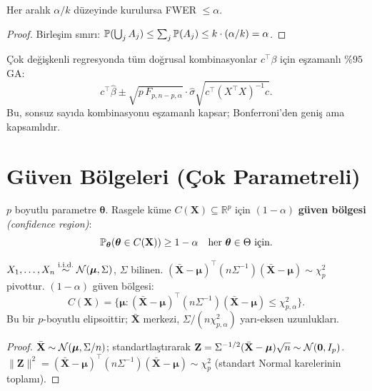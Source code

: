 \begin{teorem}\label{thm:bonferroni_ga}
Her aralık $\alpha/k$ düzeyinde kurulursa FWER $\leq\alpha$.
\end{teorem}

\begin{proof}
Birleşim sınırı: $\mathbb{P}(\bigcup_j A_j)\leq\sum_j\mathbb{P}(A_j)\leq k\cdot(\alpha/k)=\alpha$.
\end{proof}

\begin{teorem}\label{thm:scheffe_ga}
Çok değişkenli regresyonda tüm doğrusal kombinasyonlar $c^\top\beta$ için eşzamanlı \%$95$ GA:
\[
  c^\top\hat\beta \pm \sqrt{p\,F_{p,n-p,\alpha}}\cdot\hat\sigma\sqrt{c^\top(X^\top X)^{-1}c}.
\]
Bu, sonsuz sayıda kombinasyonu eşzamanlı kapsar; Bonferroni'den geniş ama kapsamlıdır.
\end{teorem}

\section{Güven Bölgeleri (Çok Parametreli)}
\label{sec:guven_bolgesi}

\begin{tanim}\label{def:guven_bolgesi}
$p$ boyutlu parametre $\boldsymbol\theta$. Rasgele küme $C(\mathbf{X})\subseteq\mathbb{R}^p$ için $(1-\alpha)$ \textbf{güven bölgesi} \emph{(confidence region)}:
\[
  \mathbb{P}_{\boldsymbol\theta}(\boldsymbol\theta\in C(\mathbf{X})) \geq 1-\alpha \quad \text{her } \boldsymbol\theta\in\Theta \text{ için.}
\]
\end{tanim}

\begin{teorem}\label{thm:eliptik_bolge}
$X_1,\ldots,X_n\overset{\text{i.i.d.}}{\sim}\mathcal{N}(\boldsymbol\mu,\Sigma)$, $\Sigma$ bilinen. $(\bar{\mathbf{X}}-\boldsymbol\mu)^\top (n\Sigma^{-1})(\bar{\mathbf{X}}-\boldsymbol\mu)\sim\chi^2_p$ pivottur. $(1-\alpha)$ güven bölgesi:
\[
  C(\mathbf{X}) = \{\boldsymbol\mu: (\bar{\mathbf{X}}-\boldsymbol\mu)^\top (n\Sigma^{-1})(\bar{\mathbf{X}}-\boldsymbol\mu) \leq \chi^2_{p,\alpha}\}.
\]
Bu bir $p$-boyutlu elipsoittir; $\bar{\mathbf{X}}$ merkezi, $\Sigma/(n\chi^2_{p,\alpha})$ yarı-eksen uzunlukları.
\end{teorem}

\begin{proof}
$\bar{\mathbf{X}}\sim\mathcal{N}(\boldsymbol\mu,\Sigma/n)$; standartlaştırarak $\mathbf{Z}=\Sigma^{-1/2}(\bar{\mathbf{X}}-\boldsymbol\mu)\sqrt{n}\sim\mathcal{N}(\mathbf{0},I_p)$. $\|\mathbf{Z}\|^2=(\bar{\mathbf{X}}-\boldsymbol\mu)^\top(n\Sigma^{-1})(\bar{\mathbf{X}}-\boldsymbol\mu)\sim\chi^2_p$ (standart Normal karelerinin toplamı).
\end{proof}

